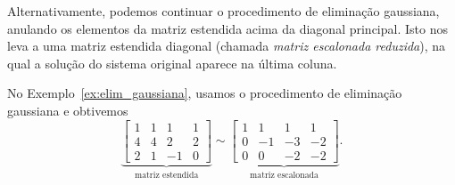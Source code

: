 \documentclass[
	12pt,				%
	oneside,			%
	a4paper,			%
	english,			%
	french,				%
	spanish,			%
	brazil				%
	]{abntex2}
\begin{document}
Alternativamente, podemos continuar o procedimento de eliminação gaussiana, anulando os elementos da matriz estendida acima da diagonal principal. Isto nos leva a uma matriz estendida diagonal (chamada \emph{matriz escalonada reduzida}), na qual a solução do sistema original aparece na última coluna.

\begin{ex}
  No Exemplo~\ref{ex:elim_gaussiana}, usamos o procedimento de eliminação gaussiana e obtivemos
  \begin{equation}
      \underbrace{
        \begin{bmatrix}
          1 & 1 & 1 & 1\\
          4 & 4 & 2 & 2\\
          2 & 1 & -1 & 0
        \end{bmatrix}
}_{\text{matriz estendida}} \sim
      \underbrace{
        \begin{bmatrix}
          1 & 1 & 1 & 1\\
          0 & -1 & -3 & -2\\
          0 & 0 & -2 & -2
        \end{bmatrix}
}_{\text{matriz escalonada}}.
  \end{equation}


\end{ex}
\end{document}
